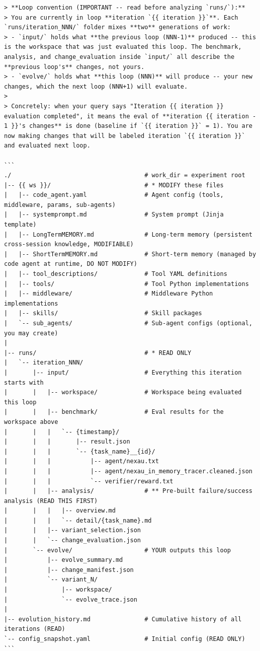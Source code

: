 \begin{tcolorbox}
\begin{lstlisting}
> **Loop convention (IMPORTANT -- read before analyzing `runs/`):**
> You are currently in loop **iteration `{{ iteration }}`**. Each `runs/iteration_NNN/` folder mixes **two** generations of work:
> - `input/` holds what **the previous loop (NNN-1)** produced -- this is the workspace that was just evaluated this loop. The benchmark, analysis, and change_evaluation inside `input/` all describe the **previous loop's** changes, not yours.
> - `evolve/` holds what **this loop (NNN)** will produce -- your new changes, which the next loop (NNN+1) will evaluate.
>
> Concretely: when your query says "Iteration {{ iteration }} evaluation completed", it means the eval of **iteration {{ iteration - 1 }}'s changes** is done (baseline if `{{ iteration }}` = 1). You are now making changes that will be labeled iteration `{{ iteration }}` and evaluated next loop.

```
./                                     # work_dir = experiment root
|-- {{ ws }}/                          # * MODIFY these files
|   |-- code_agent.yaml                # Agent config (tools, middleware, params, sub-agents)
|   |-- systemprompt.md                # System prompt (Jinja template)
|   |-- LongTermMEMORY.md              # Long-term memory (persistent cross-session knowledge, MODIFIABLE)
|   |-- ShortTermMEMORY.md             # Short-term memory (managed by code agent at runtime, DO NOT MODIFY)
|   |-- tool_descriptions/             # Tool YAML definitions
|   |-- tools/                         # Tool Python implementations
|   |-- middleware/                    # Middleware Python implementations
|   |-- skills/                        # Skill packages
|   `-- sub_agents/                    # Sub-agent configs (optional, you may create)
|
|-- runs/                              # * READ ONLY
|   `-- iteration_NNN/
|       |-- input/                     # Everything this iteration starts with
|       |   |-- workspace/             # Workspace being evaluated this loop
|       |   |-- benchmark/             # Eval results for the workspace above
|       |   |   `-- {timestamp}/
|       |   |       |-- result.json
|       |   |       `-- {task_name}__{id}/
|       |   |           |-- agent/nexau.txt
|       |   |           |-- agent/nexau_in_memory_tracer.cleaned.json
|       |   |           `-- verifier/reward.txt
|       |   |-- analysis/              # ** Pre-built failure/success analysis (READ THIS FIRST)
|       |   |   |-- overview.md
|       |   |   `-- detail/{task_name}.md
|       |   |-- variant_selection.json
|       |   `-- change_evaluation.json
|       `-- evolve/                    # YOUR outputs this loop
|           |-- evolve_summary.md
|           |-- change_manifest.json
|           `-- variant_N/
|               |-- workspace/
|               `-- evolve_trace.json
|
|-- evolution_history.md               # Cumulative history of all iterations (READ)
`-- config_snapshot.yaml               # Initial config (READ ONLY)
```



\end{lstlisting}
\end{tcolorbox}

